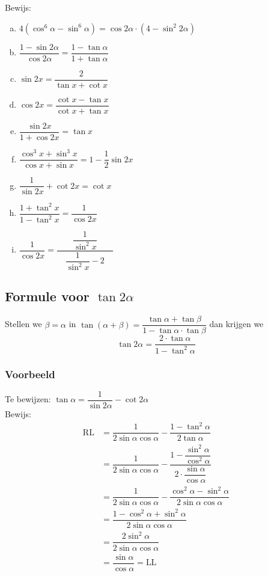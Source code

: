 \documentclass[a4paper,12pt]{article}
\begin{document}
\begin{oefening} %
Bewijs:
\begin{enumerate}[(a)]
  \itemsep.5em
  \item $\displaystyle 4(\cos^6\alpha-\sin^6\alpha)=\cos 2\alpha \cdot(4 - \sin^2 2\alpha)$
  \item $\displaystyle \dfrac{1-\sin 2\alpha}{\cos 2\alpha}=\dfrac{1-\tan\alpha}{1+\tan\alpha}$
  \item $\displaystyle \sin 2x = \dfrac{2}{\tan x + \cot x}$
  \item $\displaystyle \cos 2x = \dfrac{\cot x - \tan x}{\cot x + \tan x}$
  \item $\displaystyle \dfrac{\sin{2x}}{1+\cos 2x} = \tan x$
  \item $\displaystyle \dfrac{\cos^3 x + \sin^3 x}{\cos x + \sin x} = 1 - \dfrac{1}{2}\sin 2x$
  \item $\displaystyle \dfrac{1}{\sin 2x} + \cot 2x = \cot x$
  \item $\displaystyle \dfrac{1 + \tan^2x}{1 - \tan^2x} = \dfrac{1}{\cos 2x}$
  \item $\displaystyle \dfrac{1}{\cos 2x} = \dfrac{\dfrac{1}{\sin^2x}}{\quad\dfrac{1}{\sin^2x}-2\quad}$
\end{enumerate}
\end{oefening}

\begin{theorie}

\subsection{Formule voor $\tan 2\alpha$}

Stellen we $\beta=\alpha$ in $\tan(\alpha + \beta)=\dfrac{\tan\alpha + \tan\beta}{1-\tan\alpha\cdot\tan\beta}$ dan krijgen we
$$\tan 2\alpha = \dfrac{2\cdot \tan\alpha}{1-\tan^2\alpha}$$

\subsubsection*{Voorbeeld}

Te bewijzen: $\tan\alpha = \dfrac{1}{\sin 2\alpha} - \cot 2\alpha$\\
Bewijs:
\begin{align*}
  \mbox{RL} &= \dfrac{1}{2\sin\alpha \cos\alpha}-\dfrac{1-\tan^2\alpha}{2\tan\alpha}\\
            &= \dfrac{1}{2\sin\alpha \cos\alpha}-\dfrac{1-\dfrac{\sin^2\alpha}{\cos^2\alpha}}{2\cdot \dfrac{\sin\alpha}{\cos\alpha}}\\
            &= \dfrac{1}{2\sin\alpha \cos\alpha}-\dfrac{\cos^2\alpha - \sin^2\alpha}{2\sin\alpha\cos\alpha}\\
            &= \dfrac{1 - \cos^2\alpha + \sin^2\alpha}{2\sin\alpha \cos\alpha}\\
            &= \dfrac{2\sin^2\alpha}{2\sin\alpha \cos\alpha}\\
            &= \dfrac{\sin\alpha}{\cos\alpha} = \mbox{LL}\\
\end{align*}

\end{theorie}
\end{document}

